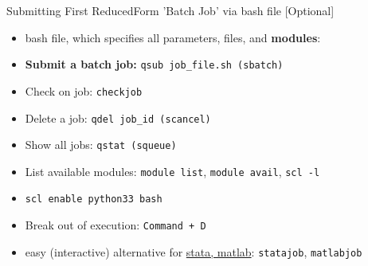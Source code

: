 \documentclass{beamer}
\begin{document}
\begin{frame}[label=BashFileSlideBack]{Submitting First ReducedForm 'Batch Job' via bash file [Optional]}
    \begin{itemize}
        \item bash file, which specifies all parameters, files, and \textbf{modules}: \hyperlink{BashFileSlide}{}
        \item \textbf{Submit a batch job:} \texttt{qsub job\_file.sh (sbatch)}
        \item Check on job: \texttt{checkjob} 
        \item Delete a job: \texttt{qdel job\_id (scancel)}
        \item Show all jobs: \texttt{qstat (squeue)}
        \item List available modules: \texttt{module list}, \texttt{module avail}, \texttt{scl -l}
        \item \texttt{scl enable python33 bash}
        \item Break out of execution: \texttt{Command + D}
        \item easy (interactive) alternative for \href{https://econ-help.mit.edu/kb/matlab-stata-rf}{stata, matlab}: \texttt{statajob}, \texttt{matlabjob}
    \end{itemize}
\end{frame}

\end{document}
